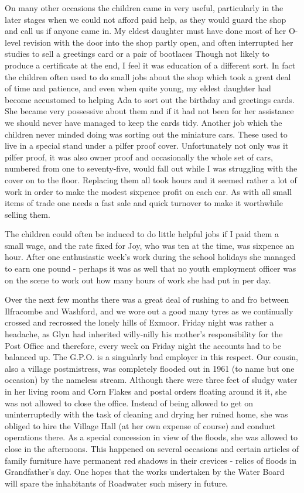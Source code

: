 On many other occasions the children came in very useful, particularly in the later stages when we could not afford paid help, as they would guard the shop and call us if anyone came in. My eldest daughter must have done most of her O-level revision with the door into the shop partly open, and often interrupted her studies to sell a greetings card or a pair of bootlaces Though not likely to produce a certificate at the end, I feel it was education of a different sort. In fact the children often used to do small jobs about the shop which took a great deal of time and patience, and even when quite young, my eldest daughter had become accustomed to helping Ada to sort out the birthday and greetings cards. She became very possessive about them and if it had not been for her assistance we should never have managed to keep the cards tidy. Another job which the children never minded doing was sorting out the miniature cars. These used to live in a special stand under a pilfer proof cover. Unfortunately not only was it pilfer proof, it was also owner proof and occasionally the whole set of cars, numbered from one to seventy-five, would fall out while I was struggling with the cover on to the floor. Replacing them all took hours and it seemed rather a lot of work in order to make the modest sixpence profit on each car. As with all small items of trade one needs a fast sale and quick turnover to make it worthwhile selling them.
	
The children could often be induced to do little helpful jobs if I paid them a small wage, and the rate fixed for Joy, who was ten at the time, was sixpence an hour. After one enthusiastic week's work during the school holidays she managed to earn one pound - perhaps it was as well that no youth employment officer was on the scene to work out how many hours of work she had put in per day.

Over the next few months there was a great deal of rushing to and fro between Ilfracombe and Washford, and we wore out a good many tyres as we continually crossed and recrossed the lonely hills of Exmoor. Friday night was rather a headache, as Glyn had inherited willy-nilly his mother's responsibility for the Post Office and therefore, every week on Friday night the accounts had to be balanced up. The G.P.O. is a singularly bad employer in this respect. Our cousin, also a village postmistress, was completely flooded out in 1961 (to name but one occasion) by the nameless stream. Although there were three feet of sludgy water in her living room and Corn Flakes and postal orders floating around it it, she was not allowed to close the office. Instead of being allowed to get on uninterruptedly with the task of cleaning and drying her ruined home, she was obliged to hire the Village Hall (at her own expense of course) and conduct operations there. As a special concession in view of the floods, she was allowed to close in the afternoons. This happened on several occasions and certain articles of family furniture have permanent red shadows in their crevices - relics of floods in Grandfather's day. One hopes that the works undertaken by the Water Board will spare the inhabitants of Roadwater such misery in future.

